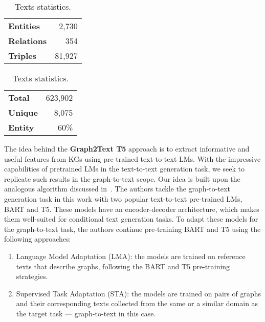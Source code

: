 \begin{table}
    \centering
    \caption{Statistics of the WebNLG 2.0 parallel knowledge graph-to-text dataset.}
    
    \begin{subtable}[t]{0.48\textwidth}
    \centering
    \begin{tabular}{lr}
        \toprule
        \textbf{Entities} & 2,730 \\
        \textbf{Relations} & 354 \\
        \textbf{Triples} & 81,927 \\
        \bottomrule
    \end{tabular}
    \caption{Knowledge Graph statistics.}
    \label{tab:kg_stats}
    \end{subtable}
    \hfill
    \begin{subtable}[t]{0.48\textwidth}
    \centering
    \begin{tabular}{lr}
        \toprule
        \textbf{Total} & 623,902 \\
        \textbf{Unique} & 8,075 \\
        \textbf{Entity} & 60\% \\
        \bottomrule
    \end{tabular}
    \caption{Texts statistics.}
    \label{tab:controllable_fusion:webnlg_label}
    \end{subtable}
\end{table}

The idea behind the \textbf{Graph2Text T5} approach is to extract informative and useful features from KGs using pre-trained text-to-text LMs. With the impressive capabilities of pretrained LMs in the text-to-text generation task, we seek to replicate such results in the graph-to-text scope. Our idea is built upon the analogous algorithm discussed in~\cite{DBLP:journals/corr/abs-2007-08426}. The authors tackle the graph-to-text generation task in this work with two popular text-to-text pre-trained LMs, BART and T5. These models have an encoder-decoder architecture, which makes them well-suited for conditional text generation tasks. To adapt these models for the graph-to-text task, the authors continue pre-training BART and T5 using the following approaches:

\begin{enumerate}
    \item Language Model Adaptation (LMA): the models are trained on reference texts that describe graphs, following the BART and T5 pre-training strategies.
    \item Supervised Task Adaptation (STA): the models are trained on pairs of graphs and their corresponding texts collected from the same or a similar domain as the target task --- graph-to-text in this case. 
\end{enumerate}

